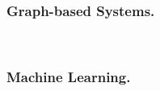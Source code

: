 \begin{comment}

\noindent\rule{\linewidth}{1px}

\tick\nuevaHerramienta{\cite{mihalcea2007} Wikify}
{2007}
{Wikipedia}
{Prominence + Local}
{N-grams}
{Dictionary (exact matching) + Refinement with three measures: TF-IDF, $X^2$ independence test and keyphraseness (prominence)}
{Two methods: Overlapping between contexts; and SML classifier (Naive Bayes) based on prominence.}


\tick\nuevaHerramienta{\cite{cucerzan2007} Cucerzan}
{2007}
{Wikipedia}
{Joint (Local)}
{Capitalization analysis}
{Capitalization rules + Dictionary. Classification in Person, Location, Organization or Miscellaneous. Candidate detection with partial matching.}
{For each possible combination of entity annotations, overlapping between document vector (which aggregates all the contexts and categories of the detected surface forms) and entity vector (which aggregates the Wikipedia contextual information and categories of the selected candidates)}

\tick\nuevaHerramienta{\cite{fader2009} \textsc{grounder}}
{2009}
{Wikipedia}
{Prominence + Local}
{Unknown}
{Unknown (probably dictionary with surface forms taken from Wikipedia)}
{Prominence + Cosine Similarity Function between context of the mention and each candidate entity's context info (combined through Bayes' theorem)}

\tick\nuevaHerramienta{\cite{mendes2011,daiber2013} DBpedia Spotlight}
{2011}
{DBpedia}
{Prominence + Local}
{LingPipe Exact Dictionary-Based Chunker using the surface form catalog}
{Dictionary}
{Cosine Similarity Function between contexts + Prominence + Inverse Candidate Frequency}

\tick\nuevaHerramienta{\cite{caliano2016} UniMiB}
{2016}
{DBpedia}
{Prominence + Local (Microposts)}
{T-NER (Ritter et al.)}
{T-NER (Ritter et al.): CRF}
{Scoring based on popularity of each entity and lexical similarity (both contextual and from the mention)}

\noindent\rule{\linewidth}{1px}

\end{comment}

\subsubsection{Graph-based Systems.}~


\subsubsection{Machine Learning.}~

